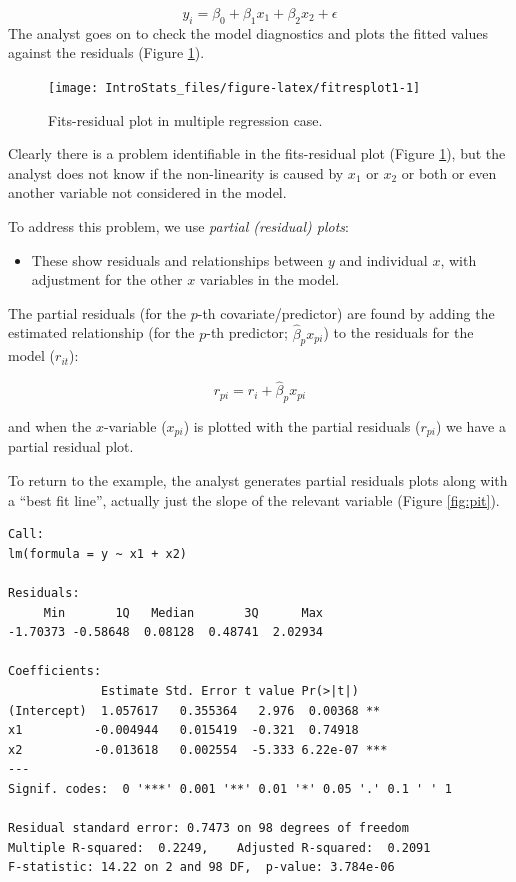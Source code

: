 \documentclass[
  oneside]{krantz}
\providecommand{\tightlist}{%
  \setlength{\itemsep}{0pt}\setlength{\parskip}{0pt}}
\begin{document}
\[y_i= \beta_0 +\beta_1x_1+\beta_2x_2+\epsilon\]
The analyst goes on to check the model diagnostics and plots the fitted values against the residuals (Figure \ref{fig:fitresplot1}).

\begin{figure}

{\centering \texttt{[image: IntroStats\_files/figure-latex/fitresplot1-1]} 

}

\caption{Fits-residual plot in multiple regression case.}\label{fig:fitresplot1}
\end{figure}

Clearly there is a problem identifiable in the fits-residual plot (Figure \ref{fig:fitresplot1}), but the analyst does not know if the non-linearity is caused by \(x_1\) or \(x_2\) or both or even another variable not considered in the model.

To address this problem, we use \emph{partial (residual) plots}:

\begin{itemize}
\tightlist
\item
  These show residuals and relationships between \(y\) and individual \(x\), with adjustment for the other \(x\) variables in the model.
\end{itemize}

The partial residuals (for the \(p\)-th covariate/predictor) are found by adding the estimated relationship (for the \(p\)-th predictor; \(\hat{\beta}_px_{pi}\)) to the residuals for the model (\(r_{it}\)):

\begin{equation}
r_{pi}=r_{i}+\hat{\beta}_px_{pi}
\end{equation}

and when the \(x\)-variable (\(x_{pi}\)) is plotted with the partial residuals (\(r_{pi}\)) we have a partial residual plot.

To return to the example, the analyst generates partial residuals plots along with a ``best fit line'', actually just the slope of the relevant variable (Figure \ref{fig:pit}).

\begin{verbatim}
Call:
lm(formula = y ~ x1 + x2)

Residuals:
     Min       1Q   Median       3Q      Max 
-1.70373 -0.58648  0.08128  0.48741  2.02934 

Coefficients:
             Estimate Std. Error t value Pr(>|t|)    
(Intercept)  1.057617   0.355364   2.976  0.00368 ** 
x1          -0.004944   0.015419  -0.321  0.74918    
x2          -0.013618   0.002554  -5.333 6.22e-07 ***
---
Signif. codes:  0 '***' 0.001 '**' 0.01 '*' 0.05 '.' 0.1 ' ' 1

Residual standard error: 0.7473 on 98 degrees of freedom
Multiple R-squared:  0.2249,    Adjusted R-squared:  0.2091 
F-statistic: 14.22 on 2 and 98 DF,  p-value: 3.784e-06
\end{verbatim}
\end{document}
